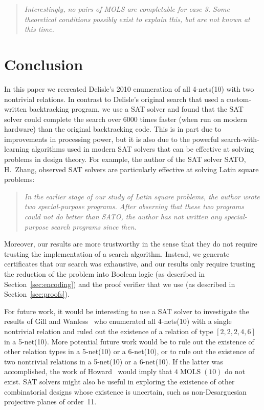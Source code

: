 \documentclass[runningheads]{llncs}
\newcommand{\MOLS}[2]{#1\operatorname{MOLS}(#2)}
\begin{document}
\begin{quote}
\emph{Interestingly, no pairs of MOLS are completable for case 3. Some theoretical conditions
possibly exist to explain this, but are not known at this time.}~\cite{delisle2010search}
\end{quote}

\section{Conclusion}\label{sec:conclusion}

In this paper we recreated Delisle's 2010 enumeration of all
4-nets(10) with two nontrivial relations.  In contrast to Delisle's original search
that used a custom-written backtracking program, we use a SAT solver and found that
the SAT solver could complete the search over 6000 times faster (when run on modern hardware)
than the original backtracking code.  This is in part due to improvements in processing power,
but it is also due to the powerful search-with-learning algorithms used in modern SAT solvers
that can be effective at solving problems in design theory.
For example, the author of the SAT solver SATO, H.~Zhang, observed SAT solvers are particularly effective
at solving Latin square problems:
\begin{quote}
\emph{In the earlier stage of our study of Latin square problems,
the author wrote two special-purpose programs.
After observing that these two programs could not do better than SATO,
the author has not written any special-purpose search programs since then.}~\cite{Zhang2021}
\end{quote}
Moreover, our results are more trustworthy in the sense that they do not require trusting
the implementation of a search algorithm.  Instead, we generate certificates that our search was
exhaustive, and our results only require trusting the reduction of
the problem into Boolean logic (as described in Section~\ref{sec:encoding})
and the proof verifier that we use (as described in Section~\ref{sec:proofs}).

For future work, it would be interesting to use a SAT solver to investigate
the results of Gill and Wanless~\cite{Gill2023} who enumerated all 4-nets(10)
with a single nontrivial relation and ruled out the existence of a relation
of type $[2,2,2,4,6]$ in a 5-net(10).  More potential future work would be to rule
out the existence of other relation types in a 5-net(10) or a 6-net(10),
or to rule out the existence of two nontrivial relations in a 5-net(10) or a
6-net(10).  If the latter was accomplished, the work of Howard~\cite{howardthesis}
would imply that $\MOLS{4}{10}$ do not exist.  SAT solvers might also be useful
in exploring the existence of other combinatorial designs whose existence is uncertain,
such as non-Desarguesian projective planes of order~11.
\end{document}
